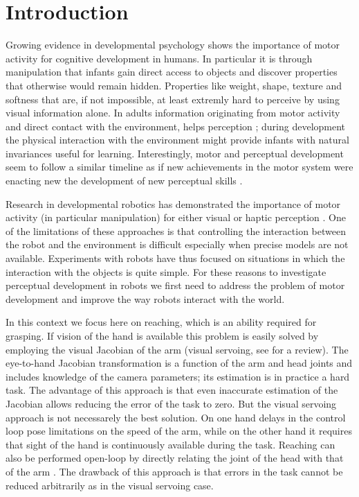\section{Introduction}
Growing evidence in developmental psychology shows the importance 
of motor activity for cognitive development in humans. In particular 
it is through manipulation that infants gain direct access to objects 
and discover properties that otherwise would remain hidden. 
Properties like weight, shape, texture and softness that 
are, if not impossible, at least extremly hard to perceive by using
visual information alone. In adults information originating 
from motor activity and direct contact with the environment, helps 
perception \cite{klatzky87hand}; during development
the physical interaction with the environment might
provide infants with natural invariances useful for learning.
Interestingly, motor and perceptual development seem to follow a similar 
timeline as if new achievements in the motor system were enacting new
the development of new perceptual skills 
\cite{bushnell93motor}.

Research in developmental robotics has demonstrated the importance of
motor activity (in particular manipulation) for either visual or haptic 
perception \cite{fitzpatrick07shared}. One of the 
limitations of these approaches is that controlling the interaction between
the robot and the environment is difficult especially when precise models are
not available. Experiments with robots have thus focused on situations
in which the interaction with the objects is quite simple. For these reasons
to investigate perceptual development in robots we first need to 
address the problem of motor development and improve the way robots interact
with the world.

In this context we focus here on reaching, which is an ability required for 
grasping. If vision of the hand is available this problem is easily solved 
by employing the visual Jacobian of the arm (visual servoing, see 
\cite{hutchinson96tutorial} for a review). The 
eye-to-hand Jacobian transformation is a function of the arm and head joints 
and includes knowledge of the camera parameters; its estimation is in practice 
a hard task.
The advantage of this approach is that even inaccurate estimation of the Jacobian
allows reducing the error of the task to zero. But the visual servoing approach 
is not necessarely the best solution. On one hand delays in the control loop pose 
limitations on the speed of the arm, while on the other hand it
requires that sight of the hand is continuously available during the task. 
Reaching can also be performed open-loop by directly relating the joint of 
the head with that of the arm 
\cite{blackburn94learning,metta99developmental}. 
The drawback of this approach is that errors in the task cannot be reduced 
arbitrarily as in the visual servoing case.

